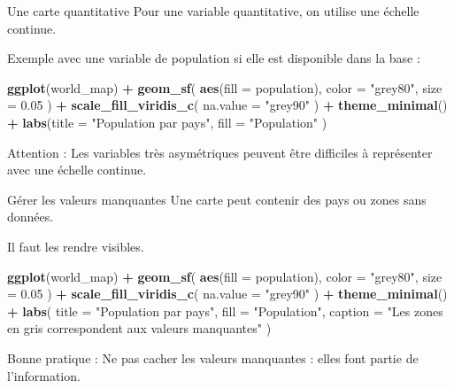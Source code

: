 \documentclass[
  10pt,
  ignorenonframetext,
]{beamer}
\newenvironment{Shaded}{\begin{snugshade}}{\end{snugshade}}
\newcommand{\AttributeTok}[1]{\textcolor[rgb]{0.13,0.29,0.53}{#1}}
\newcommand{\FloatTok}[1]{\textcolor[rgb]{0.00,0.00,0.81}{#1}}
\newcommand{\FunctionTok}[1]{\textcolor[rgb]{0.13,0.29,0.53}{\textbf{#1}}}
\newcommand{\NormalTok}[1]{#1}
\newcommand{\SpecialCharTok}[1]{\textcolor[rgb]{0.81,0.36,0.00}{\textbf{#1}}}
\newcommand{\StringTok}[1]{\textcolor[rgb]{0.31,0.60,0.02}{#1}}
\begin{document}
\begin{frame}[fragile]{Une carte quantitative}
\label{une-carte-quantitative}
Pour une variable quantitative, on utilise une échelle continue.

Exemple avec une variable de population si elle est disponible dans la
base :

\begin{Shaded}
\begin{Highlighting}[]
\FunctionTok{ggplot}\NormalTok{(world\_map) }\SpecialCharTok{+}
  \FunctionTok{geom\_sf}\NormalTok{(}
    \FunctionTok{aes}\NormalTok{(}\AttributeTok{fill =}\NormalTok{ population),}
    \AttributeTok{color =} \StringTok{"grey80"}\NormalTok{,}
    \AttributeTok{size =} \FloatTok{0.05}
\NormalTok{  ) }\SpecialCharTok{+}
  \FunctionTok{scale\_fill\_viridis\_c}\NormalTok{(}
    \AttributeTok{na.value =} \StringTok{"grey90"}
\NormalTok{  ) }\SpecialCharTok{+}
  \FunctionTok{theme\_minimal}\NormalTok{() }\SpecialCharTok{+}
  \FunctionTok{labs}\NormalTok{(}\AttributeTok{title =} \StringTok{"Population par pays"}\NormalTok{,}
    \AttributeTok{fill =} \StringTok{"Population"}\NormalTok{  )}
\end{Highlighting}
\end{Shaded}

Attention : Les variables très asymétriques peuvent être difficiles à
représenter avec une échelle continue.
\end{frame}

\begin{frame}[fragile]{Gérer les valeurs manquantes}
\label{guxe9rer-les-valeurs-manquantes}
Une carte peut contenir des pays ou zones sans données.

Il faut les rendre visibles.

\begin{Shaded}
\begin{Highlighting}[]
\FunctionTok{ggplot}\NormalTok{(world\_map) }\SpecialCharTok{+}
  \FunctionTok{geom\_sf}\NormalTok{(}
    \FunctionTok{aes}\NormalTok{(}\AttributeTok{fill =}\NormalTok{ population),}
    \AttributeTok{color =} \StringTok{"grey80"}\NormalTok{,}
    \AttributeTok{size =} \FloatTok{0.05}
\NormalTok{  ) }\SpecialCharTok{+}
  \FunctionTok{scale\_fill\_viridis\_c}\NormalTok{(}
    \AttributeTok{na.value =} \StringTok{"grey90"}
\NormalTok{  ) }\SpecialCharTok{+}
  \FunctionTok{theme\_minimal}\NormalTok{() }\SpecialCharTok{+}
  \FunctionTok{labs}\NormalTok{(}
    \AttributeTok{title =} \StringTok{"Population par pays"}\NormalTok{,}
    \AttributeTok{fill =} \StringTok{"Population"}\NormalTok{,}
    \AttributeTok{caption =} \StringTok{"Les zones en gris correspondent aux valeurs manquantes"}
\NormalTok{  )}
\end{Highlighting}
\end{Shaded}

Bonne pratique : Ne pas cacher les valeurs manquantes : elles font
partie de l'information.
\end{frame}
\end{document}
